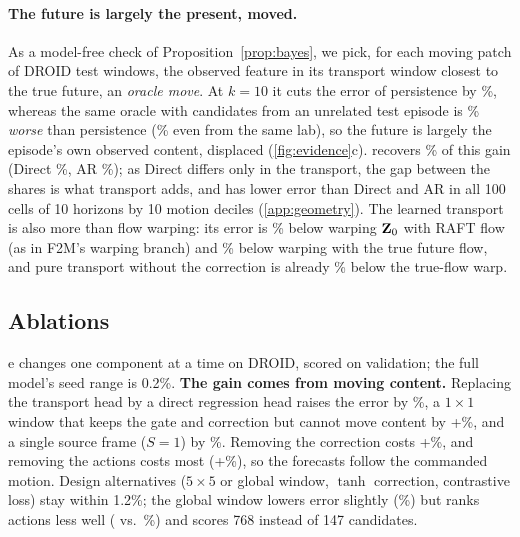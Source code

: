 \paragraph{The future is largely the present, moved.} As a model-free check of Proposition~\ref{prop:bayes}, we pick, for each moving
patch of \geoWindows{} DROID test windows, the observed feature in its transport window closest to the true future, an
\emph{oracle move}.
%
At $k{=}10$ it cuts the error of persistence by \geoOracleRed\%, whereas the same oracle with candidates from an
unrelated test episode is \geoNullWorse\% \emph{worse} than persistence (\geoNullSameLabWorse\% even from the same lab),
so the future is largely the episode's own observed content, displaced (\cref{fig:evidence}c).
%
\ours{} recovers \geoShareShift\% of this gain (Direct \geoShareDirect\%, AR \geoShareAR\%); as Direct differs only in the
transport, the gap between the shares is what transport adds, and \ours{} has lower error than Direct and AR in all 100
cells of 10 horizons by 10 motion deciles (\cref{app:geometry}).
%
The learned transport is also more than flow warping: its error is \flowVsWarp\% below warping $\mathbf{Z}_0$ with RAFT flow
(as in F2M's warping branch) and \flowVsOracle\% below warping with the true future flow, and pure transport without
the correction is already \flowNoCorrVsOracle\% below the true-flow warp.

\subsection{Ablations}
\label{sec:ablations}
e changes one component at a time on DROID, scored on validation; the full model's seed range is
0.2\%.
%
\textbf{The gain comes from moving content.} Replacing the transport head by a direct regression head raises the error
by \abldirect\%, a $1{\times}1$ window that keeps the gate and correction but cannot move content by +\ablwone\%, and a
single source frame ($S{=}1$) by \ablsone\%.
%
Removing the correction costs +\ablnocorr\%, and removing the actions costs most (+\ablactfree\%), so the forecasts
follow the commanded motion.
%
Design alternatives ($5{\times}5$ or global window, $\tanh$ correction, contrastive loss) stay within 1.2\%; the
global window lowers error slightly (\ablglobal\%) but ranks actions less well (\ablglobalRank{} vs.\ \ablfullRank\%)
and scores 768 instead of 147 candidates.

